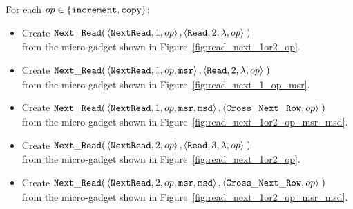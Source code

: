 For each $op\in \{ {\tt increment}, {\tt copy} \}$:
\begin{itemize}

    \item Create
    $\begin{aligned}[t]
        {\tt Next\_Read}(& \left\langle {\tt NextRead}, 1,          op \right\rangle,
                    \left\langle {\tt Read},     2, \lambda, op \right\rangle \;)
    \end{aligned}$\\from the micro-gadget shown in Figure~\ref{fig:read_next_1or2_op}.

    \item Create
    $\begin{aligned}[t]
        {\tt Next\_Read}(& \left\langle {\tt NextRead}, 1,          op, {\tt msr} \right\rangle,
                    \left\langle {\tt Read},     2, \lambda, op            \right\rangle \;)
    \end{aligned}$\\from the micro-gadget shown in Figure~\ref{fig:read_next_1_op_msr}.

    \item Create
    $\begin{aligned}[t]
        {\tt Next\_Read}(& \left\langle {\tt NextRead}, 1,      op, {\tt msr}, {\tt msd} \right\rangle,
                    \left\langle {\tt Cross\_Next\_Row}, op                       \right\rangle \;)
    \end{aligned}$\\from the micro-gadget shown in Figure~\ref{fig:read_next_1or2_op_msr_msd}.




    \item Create
    $\begin{aligned}[t]
        {\tt Next\_Read}(& \left\langle {\tt NextRead}, 2,          op \right\rangle,
                    \left\langle {\tt Read},     3, \lambda, op \right\rangle \;)
    \end{aligned}$\\from the micro-gadget shown in Figure~\ref{fig:read_next_1or2_op}.

    \item Create
    $\begin{aligned}[t]
        {\tt Next\_Read}(& \left\langle {\tt NextRead}, 2,      op, {\tt msr}, {\tt msd} \right\rangle,
                    \left\langle {\tt Cross\_Next\_Row}, op                       \right\rangle \;)
    \end{aligned}$\\from the micro-gadget shown in Figure~\ref{fig:read_next_1or2_op_msr_msd}.



\end{itemize}
